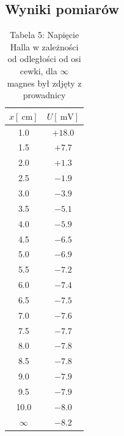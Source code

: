 \documentclass{fizykalab}
\begin{document}
{{{{\subsection*{Wyniki pomiarów}
\par
\begin{table}[H]
	\centering
	\begin{tabular}{|c|c|}
		\hline
		$x [\SI{}{\centi\meter}]$ & $U [\SI{}{\milli\volt}]$ \\ \hline
		1.0                       & $+18.0$                  \\ \hline
		1.5                       & $+7.7$                   \\ \hline
		2.0                       & $+1.3$                   \\ \hline
		2.5                       & $-1.9$                   \\ \hline
		3.0                       & $-3.9$                   \\ \hline
		3.5                       & $-5.1$                   \\ \hline
		4.0                       & $-5.9$                   \\ \hline
		4.5                       & $-6.5$                   \\ \hline
		5.0                       & $-6.9$                   \\ \hline
		5.5                       & $-7.2$                   \\ \hline
		6.0                       & $-7.4$                   \\ \hline
		6.5                       & $-7.5$                   \\ \hline
		7.0                       & $-7.6$                   \\ \hline
		7.5                       & $-7.7$                   \\ \hline
		8.0                       & $-7.8$                   \\ \hline
		8.5                       & $-7.8$                   \\ \hline
		9.0                       & $-7.9$                   \\ \hline
		9.5                       & $-7.9$                   \\ \hline
		10.0                      & $-8.0$                   \\ \hline
		$\infty$                  & $-8.2$                   \\ \hline
	\end{tabular}
	\caption*{Tabela 5: Napięcie Halla w zależności od odległości od osi cewki, dla $\infty$ magnes był zdjęty z prowadnicy}
\end{table}

}}}}
\end{document}
